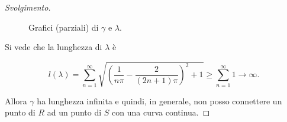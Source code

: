 \documentclass[italian,a4paper,11pt]{article}
\begin{document}
\begin{proof}[Svolgimento]
\begin{figure}[!htb]
\caption{Grafici (parziali) di $\gamma$ e $\lambda$.}
\label{fig}
\end{figure}
Si vede che la lunghezza di $\lambda$ è 

\begin{equation*}
l(\lambda) = \sum^{\infty}_{n=1} { \sqrt{\left(\frac{1}{n\pi }-\frac{2}{(2n+1)\pi }\right)^2 + 1} } \geq  \sum^{\infty}_{n=1}1 \longrightarrow \infty . 
\end{equation*}

Allora $\gamma$ ha lunghezza infinita e quindi, in generale, non posso connettere un punto di $R$ ad un punto di $S$ con una curva continua.
\end{proof}
\end{document}
